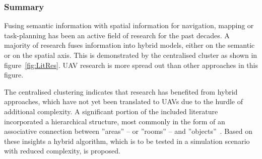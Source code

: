 \documentclass[twocolumn,letterpaper]{IEEEAerospaceCLS}  %
\begin{document}
\subsubsection{Summary} \label{sssec:ResLitSum}
Fusing semantic information with spatial information for navigation, mapping or task-planning has been an active field of research for the past decades. A majority of research fuses information into hybrid models, either on the semantic or on the spatial axis. This is demonstrated by the centralised cluster as shown in figure~\ref{fig:LitRes}. UAV research is more spread out than other approaches in this figure.

The centralised clustering indicates that research has benefited from hybrid approaches, which have not yet been translated to UAVs due to the hurdle of additional complexity. A significant portion of the included literature incorporated a hierarchical structure, most commonly in the form of an associative connection between ''areas'' -- or ''rooms'' -- and ''objects''~\cite{galindo_robot_2008,zhang_hierarchical_2019,chaplot_object_2020,tenorth_knowrob-map_2010,borkowski_towards_2010,kuipers_spatial_2000,cavaliere_empowering_2018,cavaliere_towards_2016}. Based on these insights a hybrid algorithm, which is to be tested in a simulation scenario with reduced complexity, is proposed.
\end{document}
